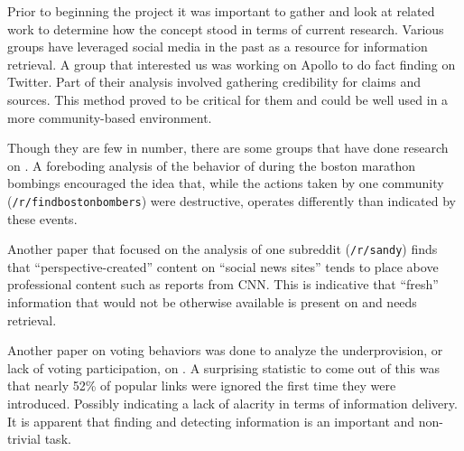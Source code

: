Prior to beginning the project it was important to gather and look at related
work to determine how the concept stood in terms of current research. Various
groups have leveraged social media in the past as a resource for information
retrieval. A group that interested us was working on Apollo to do fact finding
on Twitter. Part of their analysis involved gathering credibility for claims and
sources.\cite{Le:2011:DDL:2070942.2071018} This method proved to be critical for
them and could be well used in a more community-based environment.


Though they are few in number, there are some groups that have done research on
\reddit{}. A foreboding analysis of the behavior of \reddit{} during the boston
marathon bombings encouraged the idea that, while the actions taken by one
community (\texttt{/r/findbostonbombers}) were destructive, \reddit{} operates
differently than indicated by these events.
\cite{Potts:2013:IRC:2507065.2507079}

Another paper that focused on the analysis of one subreddit (\texttt{/r/sandy})
finds that ``perspective-created'' content on ``social news sites'' tends to
place above professional content such as reports from CNN.
\cite{Leavitt:2014:UHS:2556288.2557140} This is indicative that ``fresh''
information that would not be otherwise available is present on \reddit{} and
needs retrieval.

Another paper on voting behaviors was done to analyze the underprovision, or
lack of voting participation, on \reddit{}. A surprising statistic to come out
of this was that nearly 52\% of popular links were ignored the first time they
were introduced.\cite{Gilbert:2013:WUR:2441776.2441866} Possibly indicating a
lack of alacrity in terms of information delivery. It is apparent that finding
and detecting information is an important and non-trivial task.
